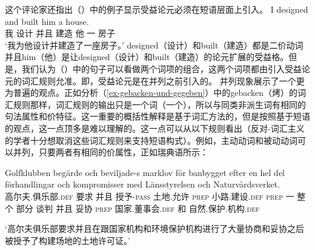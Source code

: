     这个评论家还指出（）中的例子显示受益论元必须在短语层面上引入。
\ea
\gll I designed and built him a house.\\
     我  设计 并且 建造 他 一 房子\\
\glt `我为他设计并建造了一座房子。'  
\z
designed（设计）和built（建造）都是二价动词并且him（他）是让designed（设计）和built（建造）的论元扩展的受益格。但是，我们认为（）中的句子可以看做两个词项的组合，这两个词项都由引入受益论元的词汇规则允准。即，受益论元是在并列之前引入的。
    并列现象展示了一个更为普遍的观点。正如分析（\ref{ex-gebacken-und-gegeben}）中的gebacken（烤）的词汇规则那样，词汇规则的输出只是一个词（一个\xzeroc），所以与同类非派生词有相同的句法属性和价特征。这一重要的概括性解释是基于词汇方法的，但是按照基于短语的观点，这一点顶多是难以理解的。这一点可以从以下规则看出（反对-词汇主义的学者十分想取消这些词汇规则来支持短语构式）。例如，主动动词和被动动词可以并列，只要两者有相同的价属性，正如瑞典语所示：
\ea
{\raggedright
\gll Golfklubben beg\"arde och beviljade-s marklov f\"or banbygget efter en hel del f\"orhandlingar och kompromisser med L\"ansstyrelsen och 
Naturv\aa rdsverket.\footnotemark\\
高尔夫.俱乐部.\textsc{def} 要求 并且 授予-\textsc{pass} 土地.允许 \textsc{prep} 小路.建设.\textsc{def} \textsc{prep} 一 整个 部分 谈判 并且 妥协 \textsc{prep} 国家.董事会.\textsc{def} 和 自然.保护.机构.\textsc{def} \\
\par}
\glt `高尔夫俱乐部要求并且在跟国家机构和环境保护机构进行了大量协商和妥协之后被授予了构建场地的土地许可证。'
